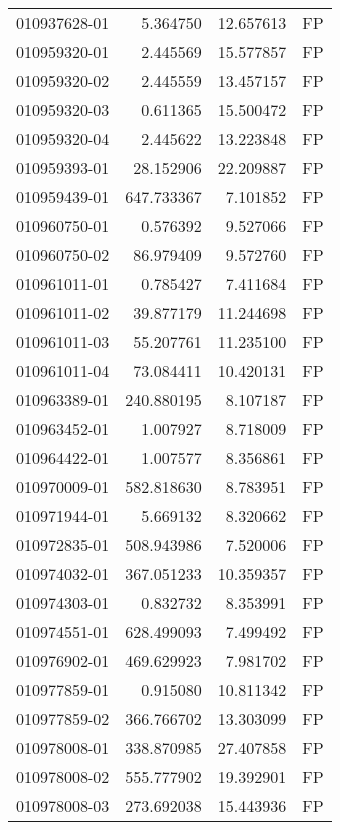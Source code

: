 \begin{tabular}{lrrl}
010937628-01 &    5.364750 &      12.657613 &   FP \\
010959320-01 &    2.445569 &      15.577857 &   FP \\
010959320-02 &    2.445559 &      13.457157 &   FP \\
010959320-03 &    0.611365 &      15.500472 &   FP \\
010959320-04 &    2.445622 &      13.223848 &   FP \\
010959393-01 &   28.152906 &      22.209887 &   FP \\
010959439-01 &  647.733367 &       7.101852 &   FP \\
010960750-01 &    0.576392 &       9.527066 &   FP \\
010960750-02 &   86.979409 &       9.572760 &   FP \\
010961011-01 &    0.785427 &       7.411684 &   FP \\
010961011-02 &   39.877179 &      11.244698 &   FP \\
010961011-03 &   55.207761 &      11.235100 &   FP \\
010961011-04 &   73.084411 &      10.420131 &   FP \\
010963389-01 &  240.880195 &       8.107187 &   FP \\
010963452-01 &    1.007927 &       8.718009 &   FP \\
010964422-01 &    1.007577 &       8.356861 &   FP \\
010970009-01 &  582.818630 &       8.783951 &   FP \\
010971944-01 &    5.669132 &       8.320662 &   FP \\
010972835-01 &  508.943986 &       7.520006 &   FP \\
010974032-01 &  367.051233 &      10.359357 &   FP \\
010974303-01 &    0.832732 &       8.353991 &   FP \\
010974551-01 &  628.499093 &       7.499492 &   FP \\
010976902-01 &  469.629923 &       7.981702 &   FP \\
010977859-01 &    0.915080 &      10.811342 &   FP \\
010977859-02 &  366.766702 &      13.303099 &   FP \\
010978008-01 &  338.870985 &      27.407858 &   FP \\
010978008-02 &  555.777902 &      19.392901 &   FP \\
010978008-03 &  273.692038 &      15.443936 &   FP \\

\end{tabular}
